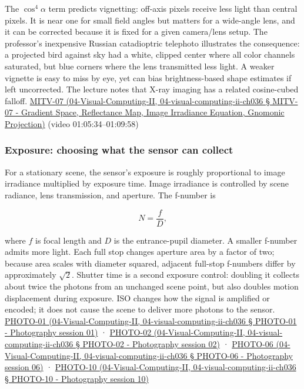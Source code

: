 The \(\cos^4\alpha\) term predicts vignetting: off-axis pixels receive less light than central pixels. It is near one for small field angles but matters for a wide-angle lens, and it can be corrected because it is fixed for a given camera/lens setup. The professor's inexpensive Russian catadioptric telephoto illustrates the consequence: a projected bird against sky had a white, clipped center where all color channels saturated, but blue corners where the lens transmitted less light. A weaker vignette is easy to miss by eye, yet can bias brightness-based shape estimates if left uncorrected. The lecture notes that X-ray imaging has a related cosine-cubed falloff. \href{}{MITV-07 (04-Visual-Computing-II, 04-visual-computing-ii-ch036 § MITV-07 - Gradient Space, Reflectance Map, Image Irradiance Equation, Gnomonic Projection)} (video 01:05:34--01:09:58)

\subsubsection{Exposure: choosing what the sensor can collect}\label{exposure-choosing-what-the-sensor-can-collect}

For a stationary scene, the sensor's exposure is roughly proportional to image irradiance multiplied by exposure time. Image irradiance is controlled by scene radiance, lens transmission, and aperture. The f-number is

\[
N=\frac{f}{D},
\]

where \(f\) is focal length and \(D\) is the entrance-pupil diameter. A smaller f-number admits more light. Each full stop changes aperture area by a factor of two; because area scales with diameter squared, adjacent full-stop f-numbers differ by approximately \(\sqrt 2\). Shutter time is a second exposure control: doubling it collects about twice the photons from an unchanged scene point, but also doubles motion displacement during exposure. ISO changes how the signal is amplified or encoded; it does not cause the scene to deliver more photons to the sensor. \href{}{PHOTO-01 (04-Visual-Computing-II, 04-visual-computing-ii-ch036 § PHOTO-01 - Photography session 01)} · \href{}{PHOTO-02 (04-Visual-Computing-II, 04-visual-computing-ii-ch036 § PHOTO-02 - Photography session 02)} · \href{}{PHOTO-06 (04-Visual-Computing-II, 04-visual-computing-ii-ch036 § PHOTO-06 - Photography session 06)} · \href{}{PHOTO-10 (04-Visual-Computing-II, 04-visual-computing-ii-ch036 § PHOTO-10 - Photography session 10)}

